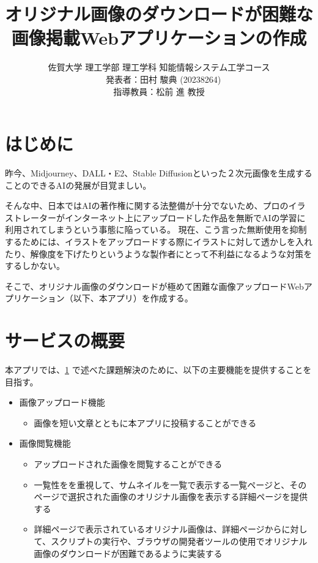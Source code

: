 ﻿\documentclass[twocolumn,a4j]{jarticle}
\title{
  オリジナル画像のダウンロードが困難な\\画像掲載Webアプリケーションの作成
}
\author{
  佐賀大学 理工学部 理工学科 知能情報システム工学コース\\
  　発表者：田村 駿典 (20238264)\\
  指導教員：松前 進 教授
}
\begin{document}
\date{\empty}
\maketitle
\thispagestyle{empty}

\section{はじめに}\label{sec:sec1}

昨今、Midjourney、DALL・E2、Stable Diffusionといった２次元画像を生成することのできるAIの発展が目覚ましい。\par
そんな中、日本ではAIの著作権に関する法整備が十分でないため、プロのイラストレーターがインターネット上にアップロードした作品を無断でAIの学習に利用されてしまうという事態に陥っている\cite{nhk}。
現在、こう言った無断使用を抑制するためには、イラストをアップロードする際にイラストに対して透かしを入れたり、解像度を下げたりというような製作者にとって不利益になるような対策をするしかない。\par
そこで、オリジナル画像のダウンロードが極めて困難な画像アップロードWebアプリケーション（以下、本アプリ）を作成する。



\section{サービスの概要}
本アプリでは、\ref{sec:sec1} で述べた課題解決のために、以下の主要機能を提供することを目指す。
\begin{itemize}
  \item 画像アップロード機能
        \setlength{\parskip}{0cm}
        \begin{itemize}
          \item 画像を短い文章とともに本アプリに投稿することができる
        \end{itemize}
  \item 画像閲覧機能
        \begin{itemize}
          \item アップロードされた画像を閲覧することができる
          \item 一覧性をを重視して、サムネイルを一覧で表示する一覧ページと、そのページで選択された画像のオリジナル画像を表示する詳細ページを提供する
          \item 詳細ページで表示されているオリジナル画像は、詳細ページからに対して、スクリプトの実行や、ブラウザの開発者ツールの使用でオリジナル画像のダウンロードが困難であるように実装する
        \end{itemize}
\end{itemize}
\end{document}
